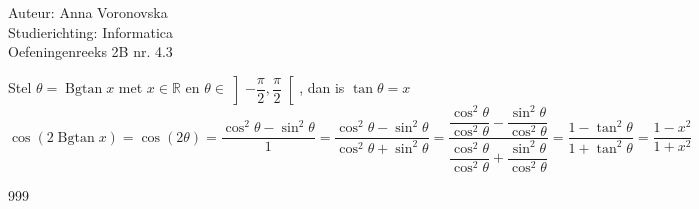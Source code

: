 \documentclass[a4paper]{article}
\begin{document}
  
\noindent \large Auteur: Anna Voronovska \\
\noindent \large Studierichting: Informatica\\
\noindent \large Oefeningenreeks 2B nr. 4.3\\

\medskip

\normalsize

Stel $\theta = \operatorname{Bgtan} x$ met $x \in \mathbb{R}$ en $\theta \in \left] -\dfrac{\pi}{2}, \dfrac{\pi}{2} \right[$, dan is $\tan \theta = x$\\

$\cos(2 \operatorname{Bgtan} x) = \cos(2\theta) = \dfrac{\cos^2 \theta - \sin^2 \theta}{1}= \dfrac{\cos^2 \theta - \sin^2 \theta}{\cos^2 \theta + \sin^2 \theta} = \dfrac{\dfrac{\cos^2 \theta}{\cos^2 \theta} - \dfrac{\sin^2 \theta}{\cos^2 \theta}}{\dfrac{\cos^2 \theta}{\cos^2 \theta} + \dfrac{\sin^2 \theta}{\cos^2 \theta}}  = \dfrac{1 - \tan^2 \theta}{1 + \tan^2 \theta} = \dfrac{1 - x^2}{1 + x^2}$\\



\begin{thebibliography}{999}
\end{thebibliography}
\end{document}
